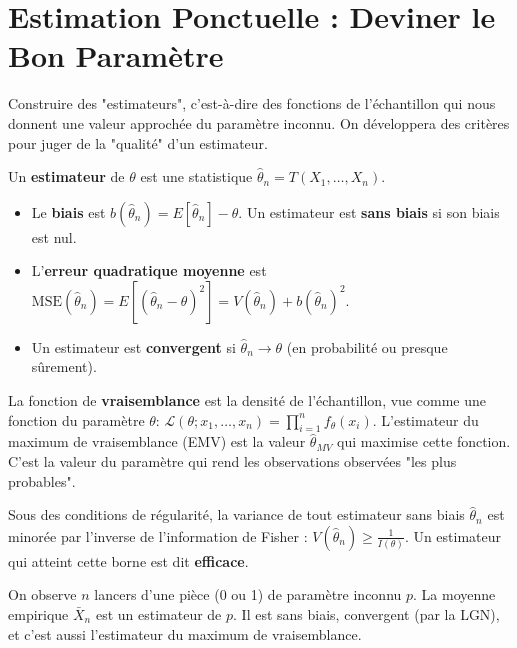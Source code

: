 \section{Estimation Ponctuelle : Deviner le Bon Paramètre}

\begin{objectif}
    Construire des "estimateurs", c'est-à-dire des fonctions de l'échantillon qui nous donnent une valeur approchée du paramètre inconnu. On développera des critères pour juger de la "qualité" d'un estimateur.
\end{objectif}

\begin{definition}
    Un \textbf{estimateur} de $\theta$ est une statistique $\hat{\theta}_n = T(X_1, \dots, X_n)$.
    \begin{itemize}
        \item Le \textbf{biais} est $b(\hat{\theta}_n) = E[\hat{\theta}_n] - \theta$. Un estimateur est \textbf{sans biais} si son biais est nul.
        \item L'\textbf{erreur quadratique moyenne} est $\mathrm{MSE}(\hat{\theta}_n) = E[(\hat{\theta}_n - \theta)^2] = V(\hat{\theta}_n) + b(\hat{\theta}_n)^2$.
        \item Un estimateur est \textbf{convergent} si $\hat{\theta}_n \to \theta$ (en probabilité ou presque sûrement).
    \end{itemize}
\end{definition}

\begin{definition}
    La fonction de \textbf{vraisemblance} est la densité de l'échantillon, vue comme une fonction du paramètre $\theta$: $\mathcal{L}(\theta; x_1, \dots, x_n) = \prod_{i=1}^n f_\theta(x_i)$.
    L'estimateur du maximum de vraisemblance (EMV) est la valeur $\hat{\theta}_{MV}$ qui maximise cette fonction. C'est la valeur du paramètre qui rend les observations observées "les plus probables".
\end{definition}

\begin{theorem}
    Sous des conditions de régularité, la variance de tout estimateur sans biais $\hat{\theta}_n$ est minorée par l'inverse de l'information de Fisher : $V(\hat{\theta}_n) \ge \frac{1}{I(\theta)}$. Un estimateur qui atteint cette borne est dit \textbf{efficace}.
\end{theorem}

\begin{example}
    On observe $n$ lancers d'une pièce (0 ou 1) de paramètre inconnu $p$. La moyenne empirique $\bar{X}_n$ est un estimateur de $p$. Il est sans biais, convergent (par la LGN), et c'est aussi l'estimateur du maximum de vraisemblance.
\end{example}


